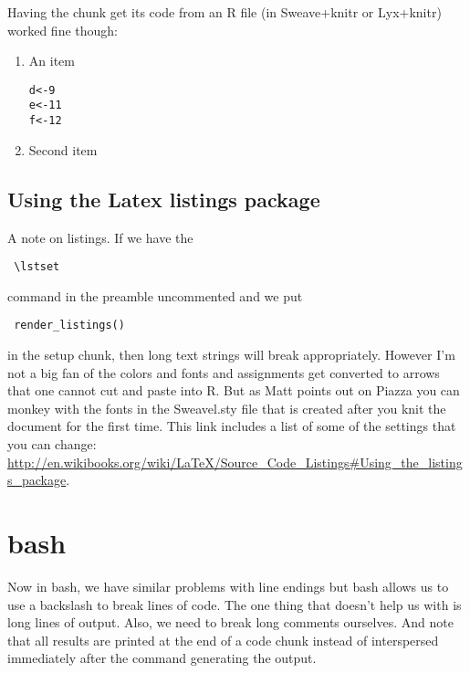 \documentclass{article}\usepackage{graphicx, color}
\makeatletter
\newenvironment{kframe}{%
 \def\at@end@of@kframe{}%
 \ifinner\ifhmode%
  \def\at@end@of@kframe{\end{minipage}}%
  \begin{minipage}{\columnwidth}%
 \fi\fi%
 \def\FrameCommand##1{\hskip\@totalleftmargin \hskip-\fboxsep
 \colorbox{shadecolor}{##1}\hskip-\fboxsep
     \hskip-\linewidth \hskip-\@totalleftmargin \hskip\columnwidth}%
 \MakeFramed {\advance\hsize-\width
   \@totalleftmargin\z@ \linewidth\hsize
   \@setminipage}}%
 {\par\unskip\endMakeFramed%
 \at@end@of@kframe}
\newenvironment{knitrout}{}{} %
\makeatother
\begin{document}
Having the chunk get its code from an R file (in Sweave+knitr or Lyx+knitr) worked fine though:

\begin{enumerate}
  
\item An item
    
\begin{knitrout}
\color{fgcolor}\begin{kframe}
\begin{alltt}
d <- 9
e <- 11
f <- 12
\end{alltt}
\end{kframe}
\end{knitrout}

    
\item Second item
 

\end{enumerate}

\subsection*{Using the Latex listings package}


A note on listings. If we have the \begin{verbatim} \lstset \end{verbatim} command in the preamble uncommented and we put \begin{verbatim} render_listings() \end{verbatim} in the setup chunk, then long text strings will break appropriately. However I'm not a big fan of the colors and fonts and assignments get converted to arrows that one cannot cut and paste into R. But as Matt points out on Piazza you can monkey with the fonts in the Sweavel.sty file that is created after you knit the document for the first time.  This link includes a list of some of the settings that you can change: \url{http://en.wikibooks.org/wiki/LaTeX/Source_Code_Listings#Using_the_listings_package}.


\section{bash}

Now in bash, we have similar problems with line endings but bash allows us to use a backslash to break lines of code. The one thing that doesn't help us with is long lines of output. Also, we need to break long comments ourselves. And note that all results are printed at the end of a code chunk instead of interspersed immediately after the command generating the output.
\end{document}
